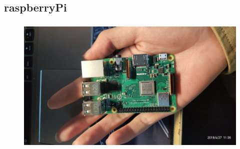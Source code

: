 \subsection{raspberryPi}
\begin{frame}
    \frametitle{}
    \begin{figure}
        \includegraphics[width=\linewidth]{Assets/raspberrypi3Bplus.jpg}
    \end{figure}
\end{frame}
